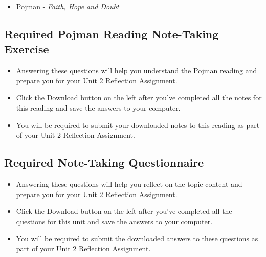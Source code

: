 \documentclass[
]{book}
\providecommand{\tightlist}{%
  \setlength{\itemsep}{0pt}\setlength{\parskip}{0pt}}
\begin{document}
\begin{itemize}
\tightlist
\item
  Pojman - \href{assets/u2/PHIL-100-Pojman-Faith-Hope-and-Doubt.pdf}{\emph{Faith, Hope and Doubt}}
\end{itemize}

\hypertarget{required-pojman-reading-note-taking-exercise}{%
\subsection*{Required Pojman Reading Note-Taking Exercise}\label{required-pojman-reading-note-taking-exercise}}

\begin{reflect}
\begin{itemize}
\tightlist
\item
  Answering these questions will help you understand the Pojman reading and prepare you for your Unit 2 Reflection Assignment.
\item
  Click the Download button on the left after you've completed all the notes for this reading and save the answers to your computer.
\item
  You will be required to submit your downloaded notes to this reading as part of your Unit 2 Reflection Assignment.
\end{itemize}
\end{reflect}

\hypertarget{required-note-taking-questionnaire-4}{%
\subsection*{Required Note-Taking Questionnaire}\label{required-note-taking-questionnaire-4}}

\begin{reflect}
\begin{itemize}
\tightlist
\item
  Answering these questions will help you reflect on the topic content and prepare you for your Unit 2 Reflection Assignment.
\item
  Click the Download button on the left after you've completed all the questions for this unit and save the answers to your computer.
\item
  You will be required to submit the downloaded answers to these questions as part of your Unit 2 Reflection Assignment.
\end{itemize}
\end{reflect}
\end{document}
